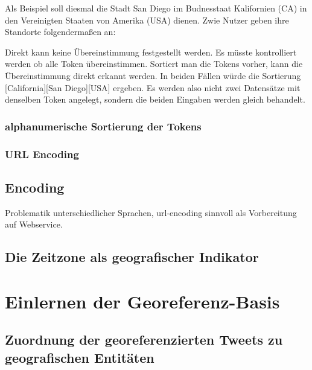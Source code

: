 		  		Als Beispiel soll diesmal die Stadt San Diego im Budnesstaat Kalifornien (CA) in den Vereinigten Staaten von Amerika (USA) dienen. 
		  		Zwie Nutzer geben ihre Standorte folgendermaßen an:


		  		Direkt kann keine Übereinstimmung festgestellt werden. 
		  		Es müsste kontrolliert werden ob alle Token übereinstimmen.
		  		Sortiert man die Tokens vorher, kann die Übereinstimmung direkt erkannt werden.
		  		In beiden Fällen würde die Sortierung [California][San Diego][USA] ergeben.
		  		Es werden also nicht zwei Datensätze mit denselben Token angelegt, sondern die beiden Eingaben werden gleich behandelt.





		  	\subsubsection{alphanumerische Sortierung der Tokens}

		  	\subsubsection{URL Encoding}
		  		\subsection{Encoding}
				Problematik unterschiedlicher Sprachen, 
				url-encoding sinnvoll als Vorbereitung auf Webservice. 

		  	

		\subsection{Die Zeitzone als geografischer Indikator}     

	\section{Einlernen der Georeferenz-Basis}

		\subsection{Zuordnung der georeferenzierten Tweets zu geografischen Entitäten} 

